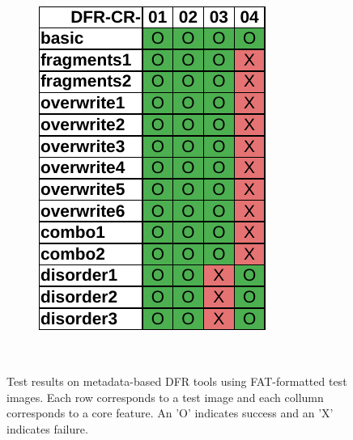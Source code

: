 \begin{figure}
\begin{subfigure}[b]{0.3\linewidth}
        \includegraphics[width=\linewidth]{fig/axiom_results_fat.pdf}
    \end{subfigure}~~
        
    \caption{Test results on metadata-based DFR tools using FAT-formatted test images. Each row corresponds to a test image and each collumn corresponds to a core feature. An 'O' indicates success and an 'X' indicates failure.}
    \label{fig:results_fat}
\end{figure}

